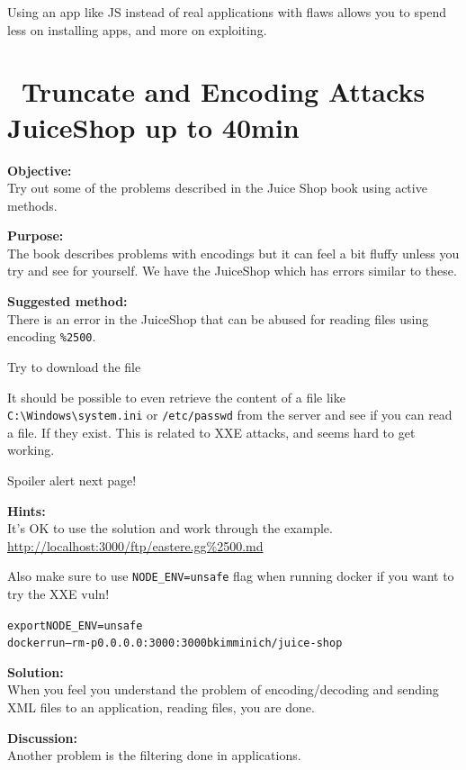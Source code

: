\documentclass[a4paper,11pt,notitlepage]{report}
\begin{document}
Using an app like JS instead of real applications with flaws allows you to spend less on installing apps, and more on exploiting.




\chapter{\faExclamationTriangle\ Truncate and Encoding Attacks JuiceShop up to 40min}
\label{ex:truncate-encoding}

{\bf Objective:}\\
Try out some of the problems described in the Juice Shop book using active methods.

{\bf Purpose:}\\
The book describes problems with encodings but it can feel a bit fluffy unless you try and see for yourself. We have the JuiceShop which has errors similar to these.

{\bf Suggested method:}\\
There is an error in the JuiceShop that can be abused for reading files using encoding \verb+%2500+.

Try to download the file 


It should be possible to even retrieve the content of a file like \verb+C:\Windows\system.ini+ or
\verb+/etc/passwd+ from the server and see if you can read a file. If they exist. This is related to XXE attacks, and seems hard to get working.

Spoiler alert next page!
\eject



{\bf Hints:}\\
It's OK to use the solution and work through the example.
\url{http://localhost:3000/ftp/eastere.gg%2500.md}

Also make sure to use \verb+NODE_ENV=unsafe+ flag when running docker if you want to try the XXE vuln!

\begin{alltt}
export NODE_ENV=unsafe
docker run --rm -p 0.0.0.0:3000:3000 bkimminich/juice-shop
\end{alltt}

{\bf Solution:}\\
When you feel you understand the problem of encoding/decoding and sending XML files to an application, reading files, you are done.

{\bf Discussion:}\\
Another problem is the filtering done in applications.
\end{document}
